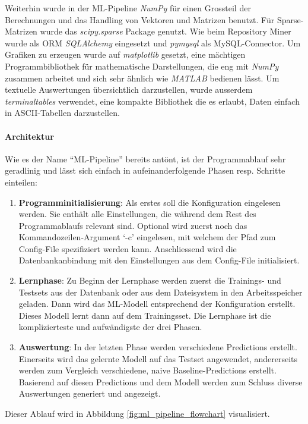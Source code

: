 \documentclass[10pt, a4paper]{article}
\begin{document}
Weiterhin wurde in der ML-Pipeline \textit{NumPy} \cite{numpy} für einen Grossteil der Berechnungen und das Handling von Vektoren und Matrizen benutzt. Für Sparse-Matrizen wurde das \textit{scipy.sparse} Package \cite{scipysparse} genutzt. 
Wie beim Repository Miner wurde als \ac{ORM} \textit{SQLAlchemy} \cite{sqlalchemy} eingesetzt und \textit{pymysql} \cite{pymysql} als MySQL-Connector. Um Grafiken zu erzeugen wurde auf \textit{matplotlib} \cite{matplotlib} gesetzt, eine mächtigen Programmbibliothek für mathematische Darstellungen, die eng mit \emph{NumPy} zusammen arbeitet und sich sehr ähnlich wie \emph{MATLAB} bedienen lässt. Um textuelle Auswertungen übersichtlich darzustellen, wurde ausserdem \textit{terminaltables} \cite{terminaltables} verwendet, eine kompakte Bibliothek die es erlaubt, Daten einfach in ASCII-Tabellen darzustellen.



\paragraph{Architektur}
Wie es der Name ``ML-Pipeline'' bereits antönt, ist der Programmablauf sehr geradlinig und lässt sich einfach in aufeinanderfolgende Phasen resp. Schritte einteilen:
\begin{enumerate}
	\item \textbf{Programminitialisierung}: Als erstes soll die Konfiguration eingelesen werden. Sie enthält alle Einstellungen, die während dem Rest des Programmablaufs relevant sind. Optional wird zuerst noch das Kommandozeilen-Argument `-c' eingelesen, mit welchem der Pfad zum Config-File spezifiziert werden kann. Anschliessend wird die Datenbankanbindung mit den Einstellungen aus dem Config-File initialisiert.
	\item \textbf{Lernphase}: Zu Beginn der Lernphase werden zuerst die Trainings- und Testsets aus der Datenbank oder aus dem Dateisystem in den Arbeitsspeicher geladen. Dann wird das \ac{ML}-Modell entsprechend der Konfiguration erstellt. Dieses Modell lernt dann auf dem Trainingsset. Die Lernphase ist die komplizierteste und aufwändigste der drei Phasen.
	\item \textbf{Auswertung}: In der letzten Phase werden verschiedene Predictions erstellt. Einerseits wird das gelernte Modell auf das Testset angewendet, andererseits werden zum Vergleich verschiedene, naive Baseline-Predictions erstellt. Basierend auf diesen Predictions und dem Modell werden zum Schluss diverse Auswertungen generiert und angezeigt.
\end{enumerate}
Dieser Ablauf wird in Abbildung \ref{fig:ml_pipeline_flowchart} visualisiert.
\end{document}

